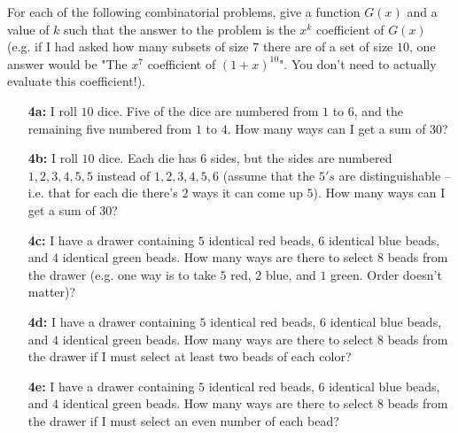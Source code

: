 \documentclass[12pt]{amsart}
\begin{document}
\begin{problem}

For each of the following combinatorial problems, give a function $G(x)$ and a value of $k$ such that the answer to the problem is the $x^k$ coefficient of $G(x)$ (e.g. if I had asked how many subsets of size $7$ there are of a set of size $10$, one answer would be "The $x^7$ coefficient of $(1+x)^{10}$".  You don't need to actually evaluate this coefficient!).
\begin{itemize}
	\item[\textbf{4a:}] I roll $10$ dice.  Five of the dice are numbered from $1$ to $6$, and the remaining five numbered from $1$ to $4$.  How many ways can I get a sum of $30$?
	\item[\textbf{4b:}] I roll $10$ dice.  Each die has $6$ sides, but the sides are numbered $1,2,3,4,5,5$ instead of $1,2,3,4,5,6$ (assume that the $5's$ are distinguishable -- i.e. that for each die there's $2$ ways it can come up $5$). How many ways can I get a sum of $30$?
	\item[\textbf{4c:}] I have a drawer containing $5$ identical red beads, $6$ identical blue beads, and $4$ identical green beads.  How many ways are there to select $8$ beads from the drawer (e.g. one way is to take $5$ red, $2$ blue, and $1$ green.  Order doesn't matter)?
	\item[\textbf{4d:}] I have a drawer containing $5$ identical red beads, $6$ identical blue beads, and $4$ identical green beads.  How many ways are there to select $8$ beads from the drawer if I must select at least two beads of each color?
	\item[\textbf{4e:}] I have a drawer containing $5$ identical red beads, $6$ identical blue beads, and $4$ identical green beads.  How many ways are there to select $8$ beads from the drawer if I must select an even number of each bead?
\end{itemize}
\end{problem}
\begin{solution}

\end{solution}

\end{document}
